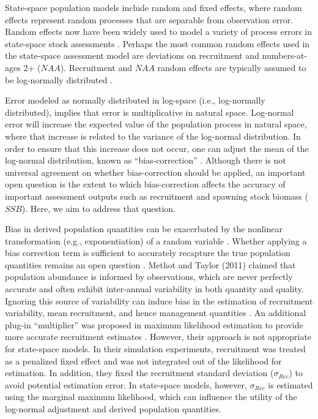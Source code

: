 \documentclass[
  12pt,
]{article}
\begin{document}
State-space population models include random and fixed effects, where
random effects represent random processes that are separable from
observation error. Random effects now have been widely used to model a
variety of process errors in state-space stock assessments
\citep{Nielsen2014, Cadigan2015, Stock2021}. Perhaps the most common
random effects used in the state-space assessment model are deviations
on recruitment and numbers-at-ages 2+ (\(NAA\)). Recruitment and \(NAA\)
random effects are typically assumed to be log-normally distributed
\citep{Stock2021}.

Error modeled as normally distributed in log-space (i.e., log-normally
distributed), implies that error is multiplicative in natural space.
Log-normal error will increase the expected value of the population
process in natural space, where that increase is related to the variance
of the log-normal distribution. In order to ensure that this increase
does not occur, one can adjust the mean of the log-normal distribution,
known as ``bias-correction'' \citep{Methot2011}. Although there is not
universal agreement on whether bias-correction should be applied, an
important open question is the extent to which bias-correction affects
the accuracy of important assessment outputs such as recruitment and
spawning stock biomass (\(SSB\)). Here, we aim to address that question.

Bias in derived population quantities can be exacerbated by the
nonlinear transformation (e.g., exponentiation) of a random variable
\citep{Thorson2016}. Whether applying a bias correction term is
sufficient to accurately recapture the true population quantities
remains an open question \citep{Deroba2016}. Methot and Taylor (2011)
claimed that population abundance is informed by observations, which are
never perfectly accurate and often exhibit inter-annual variability in
both quantity and quality. Ignoring this source of variability can
induce bias in the estimation of recruitment variability, mean
recruitment, and hence management quantities
\citep{Methot2011, Thorson2016}. An additional plug-in ``multiplier''
was proposed in maximum likelihood estimation to provide more accurate
recruitment estimates \citep{Methot2011, Thorson2016}. However, their
approach is not appropriate for state-space models. In their simulation
experiments, recruitment was treated as a penalized fixed effect and was
not integrated out of the likelihood for estimation. In addition, they
fixed the recruitment standard deviation (\(\sigma_{Rec}\)) to avoid
potential estimation error. In state-space models, however,
\(\sigma_{Rec}\) is estimated using the marginal maximum likelihood,
which can influence the utility of the log-normal adjustment and derived
population quantities.
\end{document}
